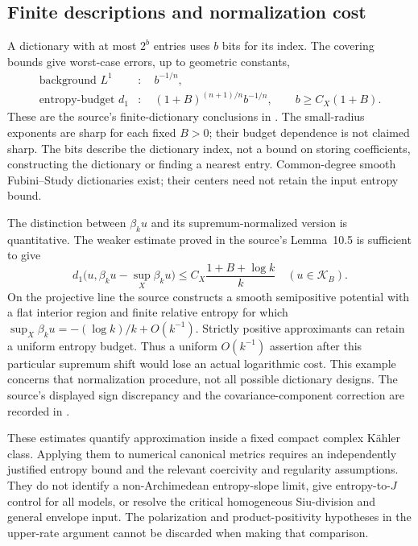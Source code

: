 \subsection{Finite descriptions and normalization cost}

A dictionary with at most $2^b$ entries uses $b$ bits for its index.
The covering bounds give worst-case errors, up to geometric
constants,
\[
 \begin{aligned}
  \text{background }L^1 &: \quad b^{-1/n},\\
  \text{entropy-budget }d_1 &: \quad
        (1+B)^{(n+1)/n}b^{-1/n},
        \qquad b\geq C_X(1+B).
 \end{aligned}
 \tag{H.131}\label{eq:appH-entropy-dictionary-errors}
\]
These are the source's finite-dictionary conclusions in
\cite[\S10]{Hisamoto26MetricEntropyV1}. The small-radius exponents
are sharp for each fixed $B>0$; their budget dependence is not
claimed sharp. The bits describe the dictionary index, not a bound
on storing coefficients, constructing the dictionary or finding a
nearest entry. Common-degree smooth Fubini--Study dictionaries exist;
their centers need not retain the input entropy bound.

The distinction between $\beta_ku$ and its supremum-normalized
version is quantitative. The weaker estimate proved in the source's
Lemma~10.5 is sufficient to give
\[
 d_1\bigl(u,\beta_ku-\sup_X\beta_ku\bigr)
       \leq C_X\frac{1+B+\log k}{k}
       \quad (u\in\mathcal K_B).
 \tag{H.132}\label{eq:appH-entropy-normalization-cost}
\]
On the projective line the source constructs a smooth semipositive
potential with a flat interior region and finite relative entropy
for which $\sup_X\beta_ku=-(\log k)/k+O(k^{-1})$.
Strictly positive approximants can retain a uniform entropy budget.
Thus a uniform $O(k^{-1})$ assertion after this particular supremum
shift would lose an actual logarithmic cost. This example concerns
that normalization procedure, not all possible dictionary designs.
The source's displayed sign discrepancy and the covariance-component
correction are recorded in .

These estimates quantify approximation inside a fixed compact complex
K\"ahler class. Applying them to numerical canonical metrics requires
an independently justified entropy bound and the relevant coercivity
and regularity assumptions. They do not identify a non-Archimedean
entropy-slope limit, give entropy-to-$J$ control for all models, or
resolve the critical homogeneous Siu-division and general envelope
input. The polarization and product-positivity hypotheses in the
upper-rate argument cannot be discarded when making that comparison.

